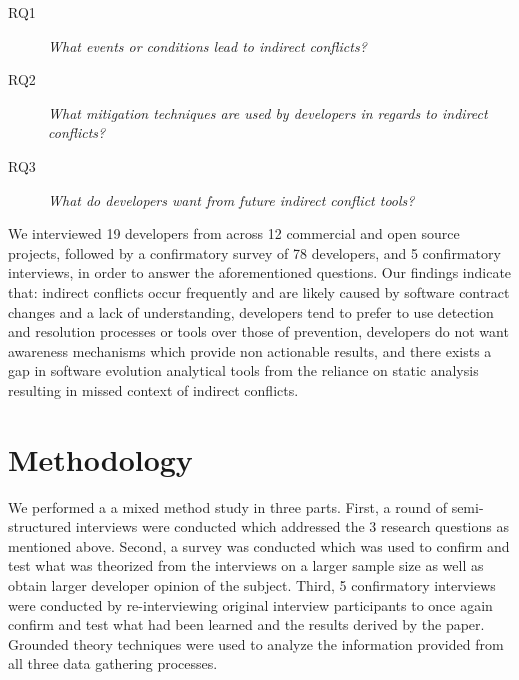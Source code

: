 \documentclass[conference]{IEEEtran}
\makeatletter
\def\namedlabel#1#2{\begingroup
   \def\@currentlabel{#2}%
   \label{#1}\endgroup
}
\makeatother
\begin{document}
\begin{description}
	\item[RQ1\namedlabel{itm:rq1}{RQ1}] \textit{What events or conditions lead to indirect conflicts?}
	\item[RQ2\namedlabel{itm:rq2}{RQ2}] \textit{What mitigation techniques are used by developers in regards to indirect conflicts?}
	\item[RQ3\namedlabel{itm:rq3}{RQ3}] \textit{What do developers want from future indirect conflict tools?}
\end{description}

We interviewed 19 developers from across 12 commercial and open source projects, followed by a confirmatory survey of 78 
developers, and 5 confirmatory interviews, in order to answer the aforementioned questions. Our findings indicate that: 
indirect conflicts occur frequently and are likely caused by software contract changes and a lack of understanding,
developers tend to prefer to use detection and resolution processes or tools
over those of prevention, developers do not want awareness mechanisms which provide non actionable results, 
and there exists a gap in software evolution analytical tools from the reliance on static analysis resulting in missed
context of indirect conflicts.

\section{Methodology}
\label{sec:meth}

We performed a a mixed method study in three parts. First, a round of semi-structured interviews were conducted which 
addressed the 3 research questions as mentioned above. Second, a survey was conducted
which was used to confirm and test what was theorized from the interviews on a larger sample size as well as obtain
larger developer opinion of the subject. Third, 5 confirmatory interviews were conducted by re-interviewing original
interview participants to once again confirm and test what had been learned and the results derived by the paper.
Grounded theory techniques were used to analyze the information provided from all three data gathering processes.
\end{document}
